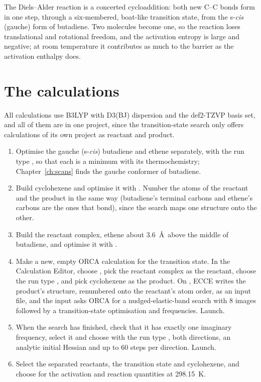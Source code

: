 The Diels--Alder reaction is a concerted cycloaddition: both new C--C bonds form in one step, through a six-membered, boat-like transition state, from the s-\emph{cis} (gauche) form of butadiene. Two molecules become one, so the reaction loses translational and rotational freedom, and the activation entropy is large and negative; at room temperature it contributes as much to the barrier as the activation enthalpy does.

\section{The calculations}
All calculations use B3LYP with D3(BJ) dispersion and the def2-TZVP basis set, and all of them are in one project, since the transition-state search only offers calculations of its own project as reactant and product.
\begin{enumerate}
	\item Optimise the gauche (s-\emph{cis}) butadiene and ethene separately, with the run type , so that each is a minimum with its thermochemistry; Chapter~\ref{ch:scans} finds the gauche conformer of butadiene.
	\item Build cyclohexene and optimise it with . Number the atoms of the reactant and the product in the same way (butadiene's terminal carbons and ethene's carbons are the ones that bond), since the search maps one structure onto the other.
	\item Build the reactant complex, ethene about 3.6~\AA\ above the middle of butadiene, and optimise it with .
	\item Make a new, empty ORCA calculation for the transition state. In the Calculation Editor, choose , pick the reactant complex as the reactant, choose the run type , and pick cyclohexene as the product. On , ECCE writes the product's structure, renumbered onto the reactant's atom order, as an input file, and the input asks ORCA for a nudged-elastic-band search with 8 images followed by a transition-state optimisation and frequencies. Launch.
	\item When the search has finished, check that it has exactly one imaginary frequency, select it and choose  with the run type , both directions, an analytic initial Hessian and up to 60 steps per direction. Launch.
	\item Select the separated reactants, the transition state and cyclohexene, and choose  for the activation and reaction quantities at 298.15~K.
\end{enumerate}

